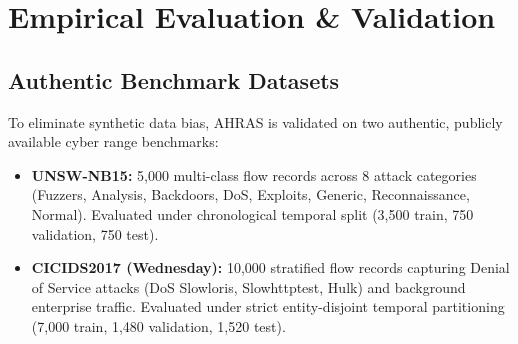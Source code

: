 \documentclass[10pt,journal,compsoc]{IEEEtran}
\begin{document}
\section{Empirical Evaluation \& Validation}

\subsection{Authentic Benchmark Datasets}
To eliminate synthetic data bias, AHRAS is validated on two authentic, publicly available cyber range benchmarks:
\begin{itemize}
    \item \textbf{UNSW-NB15:} 5,000 multi-class flow records across 8 attack categories (Fuzzers, Analysis, Backdoors, DoS, Exploits, Generic, Reconnaissance, Normal). Evaluated under chronological temporal split (3,500 train, 750 validation, 750 test).
    \item \textbf{CICIDS2017 (Wednesday):} 10,000 stratified flow records capturing Denial of Service attacks (DoS Slowloris, Slowhttptest, Hulk) and background enterprise traffic. Evaluated under strict entity-disjoint temporal partitioning (7,000 train, 1,480 validation, 1,520 test).
\end{itemize}

\begin{table}[h]
\centering
\caption{Authentic Benchmark Evaluation Results}
\label{tab:real_benchmarks}
\end{table}
\end{document}
